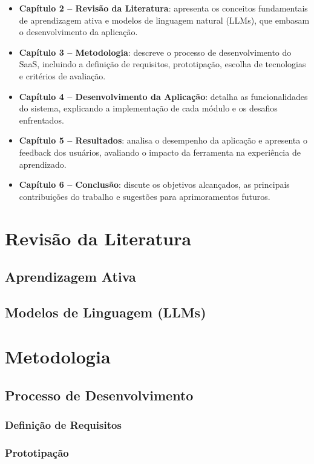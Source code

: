 \documentclass[tcc,capa]{texufpel}
\begin{document}
\begin{itemize}
    \item \textbf{Capítulo 2 – Revisão da Literatura}: apresenta os conceitos fundamentais de aprendizagem ativa e modelos de linguagem natural (LLMs), que embasam o desenvolvimento da aplicação.  
    \item \textbf{Capítulo 3 – Metodologia}: descreve o processo de desenvolvimento do SaaS, incluindo a definição de requisitos, prototipação, escolha de tecnologias e critérios de avaliação.  
    \item \textbf{Capítulo 4 – Desenvolvimento da Aplicação}: detalha as funcionalidades do sistema, explicando a implementação de cada módulo e os desafios enfrentados.  
    \item \textbf{Capítulo 5 – Resultados}: analisa o desempenho da aplicação e apresenta o feedback dos usuários, avaliando o impacto da ferramenta na experiência de aprendizado.  
    \item \textbf{Capítulo 6 – Conclusão}: discute os objetivos alcançados, as principais contribuições do trabalho e sugestões para aprimoramentos futuros.  
\end{itemize}




\chapter{Revisão da Literatura}
\section{Aprendizagem Ativa}
\section{Modelos de Linguagem (LLMs)}


\chapter{Metodologia}
\section{Processo de Desenvolvimento}
\subsection{Definição de Requisitos}
\subsection{Prototipação}
\end{document}
